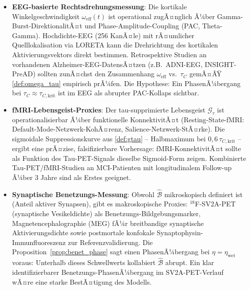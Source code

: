 ﻿\documentclass[12pt,a4paper]{article}
\theoremstyle{definition}
\begin{document}
	\begin{itemize}
		\item \textbf{EEG-basierte Rechtsdrehungsmessung}: Die kortikale Winkelgeschwindigkeit $\omega_{\mathrm{eff}}(t)$ ist operational zugÃ¤nglich Ã¼ber Gamma-Burst-DirektionalitÃ¤t und Phase-Amplitude-Coupling (PAC, Theta-Gamma). Hochdichte-EEG (256 KanÃ¤le) mit rÃ¤umlicher Quelllokalisation via LORETA kann die Drehrichtung des kortikalen Aktivierungsvektors direkt bestimmen. Retrospektive Studien an vorhandenen Alzheimer-EEG-DatensÃ¤tzen (z.B.\ ADNI-EEG, INSIGHT-PreAD) sollten zunÃ¤chst den Zusammenhang $\omega_{\mathrm{eff}}$ vs.\ $\tau_C$ gemÃ¤ÃŸ \cref{def:omega_tau} empirisch prÃ¼fen. Die Hypothese: Ein PhasenÃ¼bergang bei $\tau_C \approx \tau_{C,\mathrm{krit}}$ ist im EEG als abrupter PAC-Kollaps sichtbar.
		\item \textbf{fMRI-Lebensgeist-Proxies}: Der tau-supprimierte Lebensgeist $\mathcal{G}_\tau$ ist operationalisierbar Ã¼ber funktionelle KonnektivitÃ¤t (Resting-State-fMRI: Default-Mode-Netzwerk-KohÃ¤renz, Salience-Netzwerk-StÃ¤rke). Die sigmoidale Suppressionskurve aus \cref{def:gtau} -- Halbmaximum bei $0{,}6\,\tau_{C,\mathrm{krit}}$ -- ergibt eine prÃ¤zise, falsifizierbare Vorhersage: fMRI-KonnektivitÃ¤t sollte als Funktion des Tau-PET-Signals dieselbe Sigmoid-Form zeigen. Kombinierte Tau-PET/fMRI-Studien an MCI-Patienten mit longitudinalem Follow-up Ã¼ber 3 Jahre sind als Erstes geeignet.
		\item \textbf{Synaptische Benetzungs-Messung}: Obwohl $\hat{\mathcal{B}}$ mikroskopisch definiert ist (Anteil aktiver Synapsen), gibt es makroskopische Proxies: ${}^{18}$F-SV2A-PET (synaptische Vesikeldichte) als Benetzungs-Bildgebungsmarker, Magnetencephalographie (MEG) fÃ¼r breitbandige synaptische Aktivierungsdichte sowie postmortale konfokale Synaptophysin-Immunfluoreszenz zur Referenzvalidierung. Die Proposition~\ref{prop:benet_phase} sagt einen PhasenÃ¼bergang bei $\eta = \eta_{\mathrm{wet}}$ voraus: Unterhalb dieses Schwellwerts kollabiert $\hat{\mathcal{B}}$ abrupt. Ein klar identifizierbarer Benetzungs-PhasenÃ¼bergang im SV2A-PET-Verlauf wÃ¤re eine starke BestÃ¤tigung des Modells.
	\end{itemize}
\end{document}
